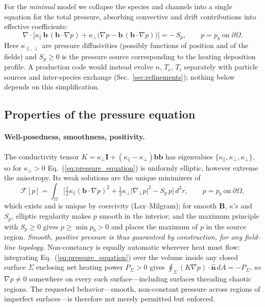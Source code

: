 \documentclass[english]{article}
\newcommand{\bB}{\mathbf{B}}
\newcommand{\bb}{\mathbf{b}}
\newcommand{\bn}{\mathbf{n}}
\newcommand{\bI}{\mathbf{I}}
\newcommand{\gradperp}{\nabla_{\!\perp}}
\begin{document}
For the \emph{minimal} model we collapse the species and channels into a single equation for the
total pressure, absorbing convective and drift contributions into effective coefficients:
\begin{equation}
\boxed{\;
\nabla\cdot\Big[\kappa_\parallel\,\bb\,(\bb\cdot\nabla p)
+\kappa_\perp\big(\nabla p-\bb\,(\bb\cdot\nabla p)\big)\Big]=-\,S_p ,
\qquad p=p_b\;\text{on}\;\partial\Omega .
\;}
\label{eq:pressure_equation}
\end{equation}
Here $\kappa_{\parallel,\perp}$ are pressure diffusivities (possibly functions of position and of
the fields) and $S_p\ge0$ is the pressure source corresponding to the heating deposition profile.
A production code would instead evolve $n$, $T_e$, $T_i$ separately with particle sources and
inter-species exchange (Sec.~\ref{sec:refinements}); nothing below depends on this simplification.

\subsection{Properties of the pressure equation}
\label{sec:p_properties}

\paragraph{Well-posedness, smoothness, positivity.}
The conductivity tensor
$K=\kappa_\perp\bI+(\kappa_\parallel-\kappa_\perp)\bb\bb$ has eigenvalues
$\{\kappa_\parallel,\kappa_\perp,\kappa_\perp\}$, so for $\kappa_\perp>0$
Eq.~(\ref{eq:pressure_equation}) is uniformly elliptic, however extreme the anisotropy. Its weak
solutions are the unique minimizers of
\begin{equation}
\mathcal{F}[p]=\int_\Omega\Big[\tfrac12\kappa_\parallel(\bb\cdot\nabla p)^{2}
+\tfrac12\kappa_\perp\big|\gradperp p\big|^{2}-S_p\,p\Big]\,d^3r ,
\qquad p=p_b\ \text{on}\ \partial\Omega ,
\label{eq:variational}
\end{equation}
which exists and is unique by coercivity (Lax--Milgram); for smooth $\bB$, $\kappa$'s and $S_p$,
elliptic regularity makes $p$ smooth in the interior; and the maximum principle with $S_p\ge0$
gives $p\ge\min p_b>0$ and places the maximum of $p$ in the source region. \emph{Smooth,
positive pressure is thus guaranteed by construction, for any field-line topology.} Non-constancy
is equally automatic wherever heat must flow: integrating Eq.~(\ref{eq:pressure_equation}) over the
volume inside any closed surface $\Sigma$ enclosing net heating power $P_\Sigma>0$ gives
$\oint_\Sigma(K\nabla p)\cdot\hat{\bn}\,dA=-P_\Sigma$, so $\nabla p\ne0$ somewhere on every such
surface---including surfaces threading chaotic regions. The requested behavior---smooth,
non-constant pressure across regions of imperfect surfaces---is therefore not merely permitted but
enforced.
\end{document}
